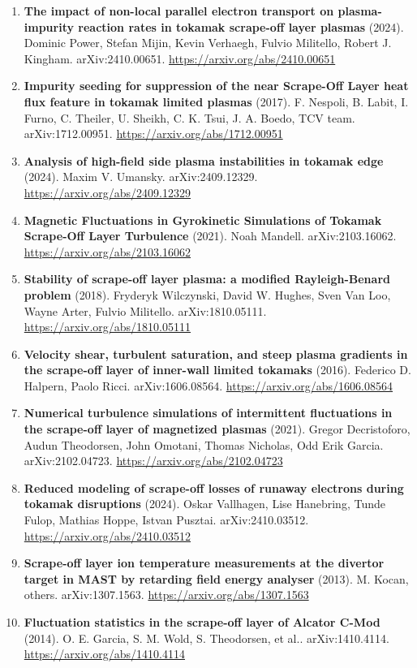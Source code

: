 \documentclass[11pt,a4paper]{article}
\begin{document}
\begin{enumerate}[leftmargin=1.4em]
\item \textbf{The impact of non-local parallel electron transport on plasma-impurity reaction rates in tokamak scrape-off layer plasmas} (2024). Dominic Power, Stefan Mijin, Kevin Verhaegh, Fulvio Militello, Robert J. Kingham. arXiv:2410.00651. \url{https://arxiv.org/abs/2410.00651}
\item \textbf{Impurity seeding for suppression of the near Scrape-Off Layer heat flux feature in tokamak limited plasmas} (2017). F. Nespoli, B. Labit, I. Furno, C. Theiler, U. Sheikh, C. K. Tsui, J. A. Boedo, TCV team. arXiv:1712.00951. \url{https://arxiv.org/abs/1712.00951}
\item \textbf{Analysis of high-field side plasma instabilities in tokamak edge} (2024). Maxim V. Umansky. arXiv:2409.12329. \url{https://arxiv.org/abs/2409.12329}
\item \textbf{Magnetic Fluctuations in Gyrokinetic Simulations of Tokamak Scrape-Off Layer Turbulence} (2021). Noah Mandell. arXiv:2103.16062. \url{https://arxiv.org/abs/2103.16062}
\item \textbf{Stability of scrape-off layer plasma: a modified Rayleigh-Benard problem} (2018). Fryderyk Wilczynski, David W. Hughes, Sven Van Loo, Wayne Arter, Fulvio Militello. arXiv:1810.05111. \url{https://arxiv.org/abs/1810.05111}
\item \textbf{Velocity shear, turbulent saturation, and steep plasma gradients in the scrape-off layer of inner-wall limited tokamaks} (2016). Federico D. Halpern, Paolo Ricci. arXiv:1606.08564. \url{https://arxiv.org/abs/1606.08564}
\item \textbf{Numerical turbulence simulations of intermittent fluctuations in the scrape-off layer of magnetized plasmas} (2021). Gregor Decristoforo, Audun Theodorsen, John Omotani, Thomas Nicholas, Odd Erik Garcia. arXiv:2102.04723. \url{https://arxiv.org/abs/2102.04723}
\item \textbf{Reduced modeling of scrape-off losses of runaway electrons during tokamak disruptions} (2024). Oskar Vallhagen, Lise Hanebring, Tunde Fulop, Mathias Hoppe, Istvan Pusztai. arXiv:2410.03512. \url{https://arxiv.org/abs/2410.03512}
\item \textbf{Scrape-off layer ion temperature measurements at the divertor target in MAST by retarding field energy analyser} (2013). M. Kocan, others. arXiv:1307.1563. \url{https://arxiv.org/abs/1307.1563}
\item \textbf{Fluctuation statistics in the scrape-off layer of Alcator C-Mod} (2014). O. E. Garcia, S. M. Wold, S. Theodorsen, et al.. arXiv:1410.4114. \url{https://arxiv.org/abs/1410.4114}

\end{enumerate}
\end{document}
